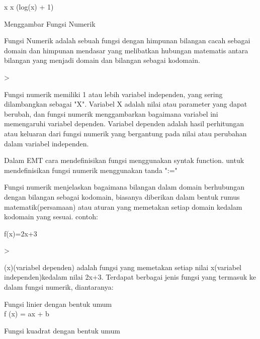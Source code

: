 \documentclass[a4paper,10pt]{article}
\begin{document}
\begin{eulernotebook}
\begin{eulercomment}
\begin{eulercomment}
\begin{euleroutput}
                              x
                             x  (log(x) + 1)
  
\end{euleroutput}
\begin{eulercomment}
Menggambar Fungsi Numerik 

Fungsi Numerik adalah sebuah fungsi dengan himpunan bilangan cacah
sebagai domain dan himpunan mendasar yang melibatkan hubungan
matematis antara bilangan yang menjadi domain dan bilangan sebagai
kodomain.
\end{eulercomment}
\begin{eulerprompt}
> 
\end{eulerprompt}
\begin{eulercomment}
Fungsi numerik  memiliki  1  atau  lebih  variabel  independen, yang
sering dilambangkan sebagai "X". Variabel X adalah nilai atau
parameter yang dapat berubah, dan fungsi numerik menggambarkan
bagaimana variabel ini memengaruhi variabel dependen. Variabel
dependen adalah hasil perhitungan atau keluaran dari fungsi numerik
yang bergantung pada nilai atau perubahan dalam variabel independen.

\end{eulercomment}
\begin{eulercomment}
Dalam EMT cara mendefinisikan fungsi menggunakan syntak function.
untuk mendefinisikan fungsi numerik menggunakan tanda ":="

Fungsi  numerik  menjelaskan bagaimana bilangan  dalam  domain
berhubungan dengan bilangan sebagai kodomain, biasanya diberikan dalam
bentuk rumus matematik(persamaan) atau aturan yang memetakan setiap
domain kedalam kodomain yang sesuai. contoh:

f(x)=2x+3
\end{eulercomment}
\begin{eulerprompt}
> 
\end{eulerprompt}
\begin{eulercomment}
(x)(variabel dependen) adalah fungsi yang memetakan setiap nilai
x(variabel independen)kedalam nilai 2x+3. Terdapat berbagai jenis
fungsi yang termasuk ke dalam fungsi numerik, diantaranya:

Fungsi linier dengan bentuk umum\\
f (x) = ax + b
\end{eulercomment}
\begin{eulercomment}
Fungsi kuadrat dengan bentuk umum


\end{eulercomment}
\end{eulercomment}
\end{eulercomment}
\end{eulernotebook}
\end{document}
